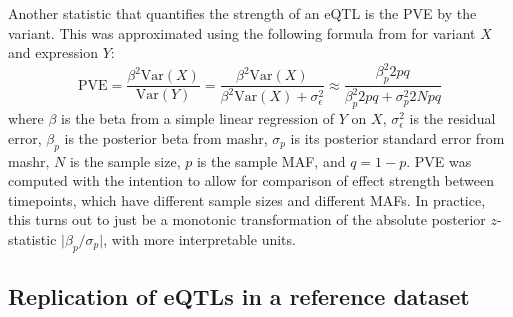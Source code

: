 Another statistic that quantifies the strength of an \gls{eQTL} is the \gls{PVE} by the variant.
This was approximated using the following formula from \textcite{shim2015MultivariateGenomeWideAssociation} for variant $X$ and expression $Y$:
\begin{equation}
    \text{PVE} = \frac{\beta^2 \text{Var}(X)}{\text{Var}(Y)} = \frac{\beta^2 \text{Var}(X)}{\beta^2 \text{Var}(X) + \sigma_{\epsilon}^2} \approx \frac{\beta_p^2 2 p q}{\beta_p^2 2 p q + \sigma_p^2 2N p q}
\end{equation}
where $\beta$ is the beta from a simple linear regression of $Y$ on $X$,
$\sigma_{\epsilon}^2$ is the residual error,
$\beta_p$ is the posterior beta from mashr,
$\sigma_p$ is its posterior standard error from mashr,
$N$ is the sample size,
$p$ is the sample \gls{MAF}, and $q=1-p$.
\gls{PVE} was computed with the intention to allow for comparison of effect strength between timepoints, which have different sample sizes and different \glspl{MAF}.
In practice, this turns out to just be a monotonic transformation of the absolute posterior $z$-statistic $\lvert \beta_p/\sigma_p \rvert$, with more interpretable units.

\subsection{Replication of eQTLs in a reference dataset}

